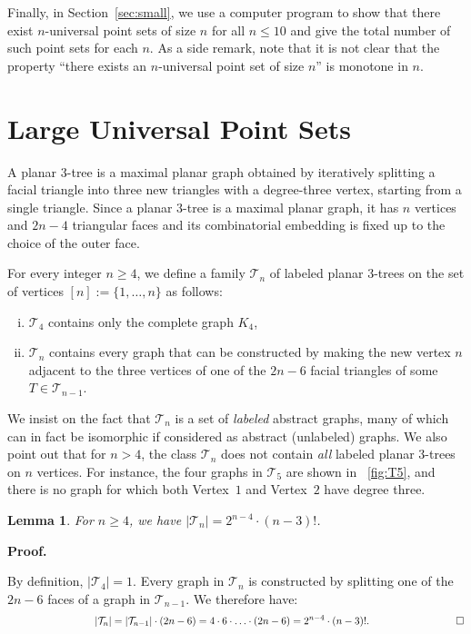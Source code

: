 \documentclass[11pt]{article}
\newtheorem{lemma}[equation]{Lemma}
\newcommand{\qed}{\hfill\ensuremath{\Box}}
\newenvironment{proof}{\noindent\textbf{Proof.}
}{\par\medskip}
\newcommand{\T}{\ensuremath{\mathcal T}}
\begin{document}
Finally, in Section~\ref{sec:small}, we use a computer program to show that
there exist $n$-universal point sets of size $n$ for all $n\le 10$ and give the
total number of such point sets for each $n$. As a side remark, note that it is
not clear that the property ``there exists an $n$-universal point set of size
$n$'' is monotone in $n$.

\section{Large Universal Point Sets}
\label{sec:uni}

A planar 3-tree is a maximal planar graph obtained by iteratively splitting a
facial triangle into three new triangles with a degree-three vertex, starting
from a single triangle. Since a planar 3-tree is a maximal planar graph, it has
$n$ vertices and $2n-4$ triangular faces and its combinatorial embedding is
fixed up to the choice of the outer face. 

For every integer $n\ge 4$, we define a family $\T_n$ of labeled planar 3-trees
on the set of vertices $[n]:=\{1,\dots,n\}$ as follows:
\begin{enumerate}[(i)]
\item $\T_4$ contains only the complete graph $K_4$,
\item $\T_n$ contains every graph that can be constructed by making the new
vertex $n$ adjacent to the three vertices of one of the $2n-6$ facial triangles
of some $T\in\T_{n-1}$.
\end{enumerate}
We insist on the fact that $\T_n$ is a set of {\em labeled} abstract graphs,
many of which can in fact be isomorphic if considered as abstract (unlabeled)
graphs. We also point out that for $n>4$, the class $\T_n$ does not contain
\emph{all} labeled planar 3-trees on $n$ vertices. For instance, the four graphs
in $\T_5$ are shown in \figurename~\ref{fig:T5}, and there is no graph for which
both Vertex~$1$ and Vertex~$2$ have degree three.

\begin{lemma}\label{lem:tn_size_lower}
  For $n\geq 4$, we have $|\T_n| = 2^{n-4}\cdot
  (n-3)!$.
\end{lemma}
\begin{proof}
  By definition, $|\T_4|=1$. Every graph in $\T_n$ is constructed by splitting
  one of the $2n-6$ faces of a graph in $\T_{n-1}$. We therefore have:
  \[
  \hspace*{3cm}|\T_n|= |\T_{n-1}|\cdot (2n-6)= 4 \cdot 6 \cdot \ldots \cdot (2n - 6)= 2^{n-4}\cdot (n-3)!.\hspace*{3cm}\qed
  \]
\end{proof}
\end{document}
